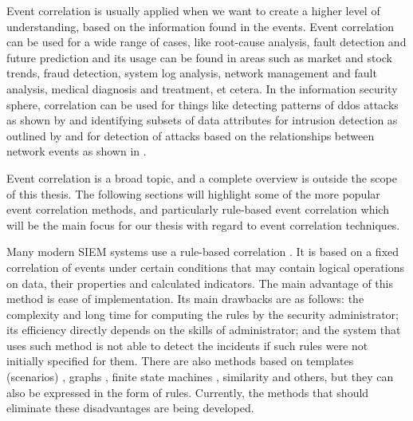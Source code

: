Event correlation is usually applied when we want to create a higher level of understanding, based on the information found in the events. Event correlation can be used for a wide range of cases, like root-cause analysis, fault detection and future prediction and its usage can be found in areas such as market and stock trends, fraud detection, system log analysis, network management and fault analysis, medical diagnosis and treatment, et cetera. In the information security sphere, correlation can be used for things like detecting patterns of \acrfull{ddos} attacks as shown by \textcite{wei_2013} and identifying subsets of data attributes for intrusion detection as outlined by \textcite{Jiang_2004} and for detection of attacks based on the relationships between network events as shown in \textcite{kruegel_2004}.

Event correlation is a broad topic, and a complete overview is outside the scope of this thesis. The following sections will highlight some of the more popular event correlation methods, and particularly rule-based event correlation which will be the main focus for our thesis with regard to event correlation techniques. 

\iffalse
Many modern SIEM systems use a rule-based correlation \textcite{hanemann_2008} \textcite{limmer_2008}. It is based on a fixed correlation of events under certain conditions that may contain logical operations on data, their properties and calculated indicators. The main advantage of this method is ease of implementation. Its main drawbacks are as follows: the complexity and long time for computing the rules by the security administrator; its efficiency directly depends on the skills of administrator; and the system that uses such method is not able to detect the incidents if such rules were not initially specified for them.
There are also
methods based on templates (scenarios) \textcite{hanemann_2008}, graphs \textcite{ghorbani_2009} \textcite{xu_2006}, finite state machines \textcite{hasan_1999} \textcite{xu_2006}, similarity \textcite{gurer_1996} \textcite{zurutuza_2004}
and others, but they can also be expressed in the form of rules.
Currently, the methods that should eliminate these disadvantages are being
developed.

